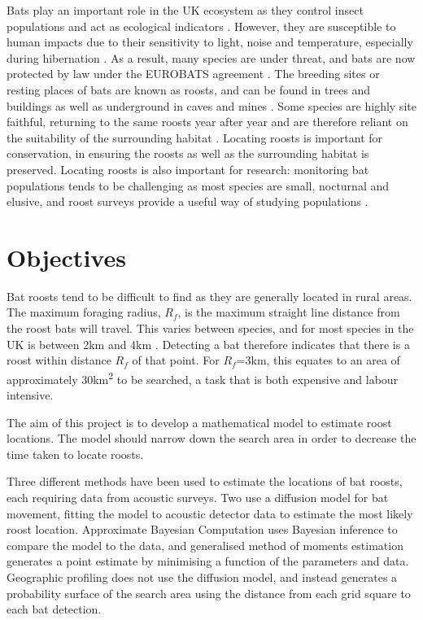 Bats play an important role in the UK ecosystem as they control insect
populations \cite{Kunz2011} and act as ecological indicators \cite{Jones2009}.
However, they are susceptible to human impacts due to their sensitivity to
light, noise and temperature, especially during hibernation \cite{Jones2009}. As
a result, many species are under threat, and bats are now protected by law under
the EUROBATS agreement \cite{Eurobats}. The breeding sites or resting places of
bats are known as roosts, and can be found in trees and buildings as well as
underground in caves and mines \cite{Eurobats}. Some species are highly site
faithful, returning to the same roosts year after year and are therefore reliant
on the suitability of the surrounding habitat \cite{Lewis1995}. Locating roosts
is important for conservation, in ensuring the roosts as well as the surrounding
habitat is preserved. Locating roosts is also important for research: monitoring
bat populations tends to be challenging as most species are small, nocturnal and
elusive, and roost surveys provide a useful way of studying populations
\cite{Flaquer2007}.

\section{Objectives}

Bat roosts tend to be difficult to find as they are generally located in rural
areas. The maximum foraging radius, $R_f$, is the maximum straight line distance from
the roost bats will travel. This varies between species, and for most species in the
UK is between 2km and 4km \cite{CSZ}. Detecting a bat therefore indicates that
there is a roost within distance $R_f$ of that point. For $R_f$=3km, this equates to
an area of approximately 30km\textsuperscript{2} to be searched, a task that is
both expensive and labour intensive.

The aim of this project is to develop a mathematical model to estimate roost
locations. The model should narrow down the search area in order to decrease the
time taken to locate roosts.


Three different methods have been used to estimate the locations of bat roosts, each requiring data from acoustic surveys. Two use a diffusion model for bat movement, fitting the model to acoustic detector data to estimate the most likely roost location. Approximate Bayesian Computation uses Bayesian inference to compare the model to the data, and generalised method of moments estimation generates a point estimate by minimising a function of the parameters and data. Geographic profiling does not use the diffusion model, and instead generates a probability surface of the search area using the distance from each grid square to each bat detection.

